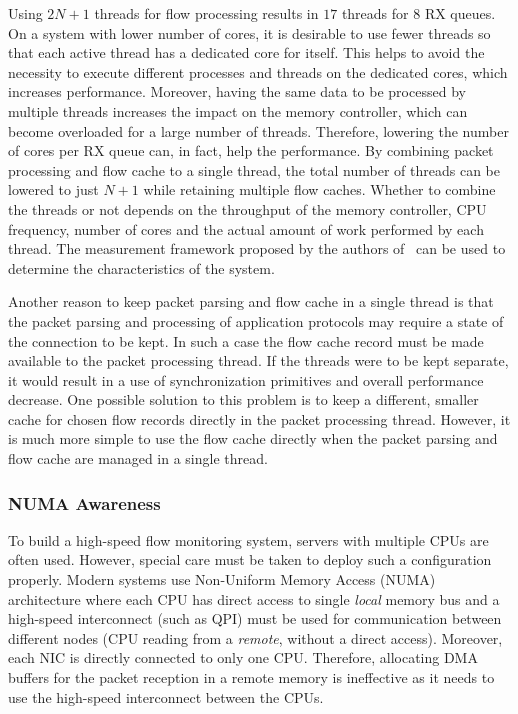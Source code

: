 Using $2N+1$ threads for flow processing results in $17$ threads for $8$ RX queues. On a system with lower number of cores, it is desirable to use fewer threads so that each active thread has a dedicated core for itself. This helps to avoid the necessity to execute different processes and threads on the dedicated cores, which increases performance. Moreover, having the same data to be processed by multiple threads increases the impact on the memory controller, which can become overloaded for a large number of threads. Therefore, lowering the number of cores per RX queue can, in fact, help the performance. By combining packet processing and flow cache to a single thread, the total number of threads can be lowered to just $N+1$ while retaining multiple flow caches. Whether to combine the threads or not depends on the throughput of the memory controller, CPU frequency, number of cores and the actual amount of work performed by each thread. The measurement framework proposed by the authors of~\cite{Gallenmueller-2015-Comparison} can be used to determine the characteristics of the system.


Another reason to keep packet parsing and flow cache in a single thread is that the packet parsing and processing of application protocols may require a state of the connection to be kept. In such a case the flow cache record must be made available to the packet processing thread. If the threads were to be kept separate, it would result in a use of synchronization primitives and overall performance decrease. One possible solution to this problem is to keep a different, smaller cache for chosen flow records directly in the packet processing thread. However, it is much more simple to use the flow cache directly when the packet parsing and flow cache are managed in a single thread.

\subsubsection{NUMA Awareness}

To build a high-speed flow monitoring system, servers with multiple CPUs are often used. However, special care must be taken to deploy such a configuration properly. Modern systems use Non-Uniform Memory Access (NUMA) architecture where each CPU has direct access to single \emph{local} memory bus and a high-speed interconnect (such as QPI) must be used for communication between different nodes (CPU reading from a \emph{remote}, without a direct access). Moreover, each NIC is directly connected to only one CPU. Therefore, allocating DMA buffers for the packet reception in a remote memory is ineffective as it needs to use the high-speed interconnect between the CPUs.

